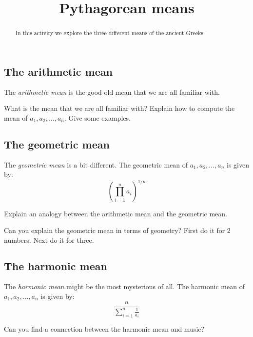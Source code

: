 \documentclass[nooutcomes]{ximera}
\title{Pythagorean means}
\begin{document}
\begin{abstract}
In this activity we explore the three different means of the
  ancient Greeks.
\end{abstract}
\maketitle


\subsection*{The arithmetic mean}

The \textit{arithmetic mean} is the good-old mean that we are all
familiar with.

\begin{question}
What is the mean that we are all familiar with? Explain how to compute
the mean of $a_1,a_2,\dots,a_n$. Give some examples.
\end{question}

\subsection*{The geometric mean}

The \textit{geometric mean} is a bit different. The geometric mean of $a_1,a_2,\dots, a_n$ is given by:
\[
\left(\prod_{i=1}^n a_i\right)^{1/n}
\]

\begin{question}
Explain an analogy between the arithmetic mean and the geometric mean.
\end{question}

\begin{question}
Can you explain the geometric mean in terms of geometry? First do it
for 2 numbers. Next do it for three.
\end{question}

\subsection*{The harmonic mean}

The \textit{harmonic mean} might be the most mysterious of all. The
harmonic mean of $a_1,a_2,\dots, a_n$ is given by:
\[
\frac{n}{\sum_{i=1}^n \frac{1}{a_i}}
\]

\begin{exploration}
Can you find a connection between the harmonic mean and music?
\end{exploration}
\end{document}
